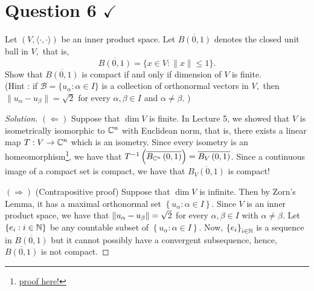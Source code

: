 \section{Question 6 \texorpdfstring{$\checkmark$}{}}
\horz
Let $(V,\langle \cdot, \cdot \rangle)$ be an inner product space. Let $\overline{B(0,1)}$ denotes the closed unit ball in $V,$ that is, $$\overline{B(0,1)} = \{x\in V : \|x\|\leqslant 1\}.$$ Show that $\overline{B(0,1)}$ is compact if and only if dimension of $V$ is finite. \\
(Hint : if $\mathcal B = \{u_{\alpha} : \alpha\in I\}$ is a collection of orthonormal vectors in $V,$ then $\|u_{\alpha}-u_{\beta}\|=\sqrt{2}$ for  every $\alpha,\beta\in I$ and $\alpha \neq \beta.$ )
\horz

\begin{proof}[Solution]
    $\left( \Longleftarrow \right)$ Suppose that $\dim V$ is finite. In Lecture 5, we showed that $V$ is isometrically isomorphic to $\mathbb C ^{n}$ with Euclidean norm, that is, there exists a linear map $T: V \to \mathbb C^{n}$ which is an isometry. 
    Since every isometry is an homeomorphism\footnote{\href{https://planetmath.org/isometry}{proof here!}}, we have that $T^{-1} \left( \overline{B_{\mathbb C^{n}}\left( 0,1 \right)} \right) = \overline{B_{V} \left( 0,1 \right)}$. Since a continuous image of a compact set is compact, we have that $\overline{B_{V}(0,1)}$ is compact!

    $\left( \Longrightarrow \right)$ (Contrapositive proof) Suppose that $\dim V$ is infinite. Then by Zorn's Lemma, it has a maximal orthonormal set $\left\{ u_{\alpha} : \alpha \in I \right\}$. Since $V$ is an inner product space, we have that $\left\lVert u_{\alpha} - u_{\beta} \right\rVert = \sqrt{2}$ for every $\alpha , \beta \in I$ with $\alpha \ne \beta$. Let $\left\{ e_{i} : i \in \mathbb N \right\}$ be any countable subset of $\left\{ u_{\alpha} : \alpha \in I \right\}$. Now, $\left\{ e_{i} \right\}_{i\in \mathbb N}$ is a sequence in $\overline {B(0,1)}$ but it cannot possibly have a convergent subsequence, hence, $\overline{B(0,1)}$ is not compact.
\end{proof}
